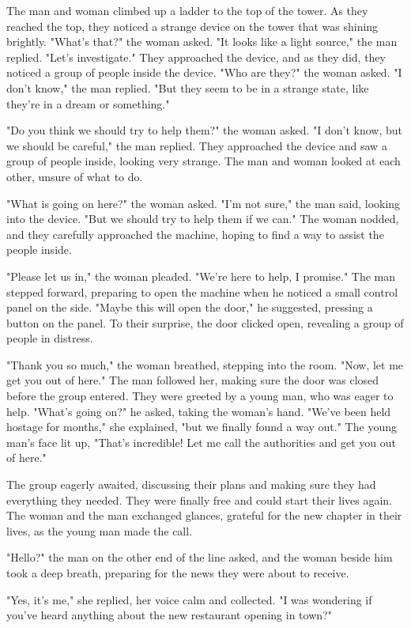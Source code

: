 \documentclass[smalldemyvopaper,11pt,twoside,onecolumn,openright,extrafontsizes]{memoir}
\begin{document}
The man and woman climbed up a ladder to the top of the tower. As they reached the top, they noticed a strange device on the tower that was shining brightly. "What's that?" the woman asked. "It looks like a light source," the man replied. "Let's investigate." They approached the device, and as they did, they noticed a group of people inside the device. "Who are they?" the woman asked. "I don't know," the man replied. "But they seem to be in a strange state, like they're in a dream or something."\par
"Do you think we should try to help them?" the woman asked. "I don't know, but we should be careful," the man replied. They approached the device and saw a group of people inside, looking very strange. The man and woman looked at each other, unsure of what to do.\par
"What is going on here?" the woman asked. "I'm not sure," the man said, looking into the device. "But we should try to help them if we can." The woman nodded, and they carefully approached the machine, hoping to find a way to assist the people inside.\par
"Please let us in," the woman pleaded. "We're here to help, I promise." The man stepped forward, preparing to open the machine when he noticed a small control panel on the side. "Maybe this will open the door," he suggested, pressing a button on the panel. To their surprise, the door clicked open, revealing a group of people in distress.\par
"Thank you so much," the woman breathed, stepping into the room. "Now, let me get you out of here." The man followed her, making sure the door was closed before the group entered. They were greeted by a young man, who was eager to help. "What's going on?" he asked, taking the woman's hand. "We've been held hostage for months," she explained, "but we finally found a way out." The young man's face lit up, "That's incredible! Let me call the authorities and get you out of here."\par
The group eagerly awaited, discussing their plans and making sure they had everything they needed. They were finally free and could start their lives again. The woman and the man exchanged glances, grateful for the new chapter in their lives, as the young man made the call.\par
"Hello?" the man on the other end of the line asked, and the woman beside him took a deep breath, preparing for the news they were about to receive.\par
"Yes, it's me," she replied, her voice calm and collected. "I was wondering if you've heard anything about the new restaurant opening in town?"\par
\end{document}
